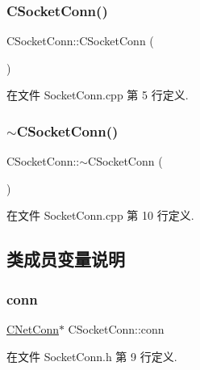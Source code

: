 \subsubsection{\texorpdfstring{C\+Socket\+Conn()}{CSocketConn()}}
{\footnotesize\ttfamily C\+Socket\+Conn\+::\+C\+Socket\+Conn (\begin{DoxyParamCaption}{ }\end{DoxyParamCaption})}



在文件 Socket\+Conn.\+cpp 第 5 行定义.

\mbox{\label{class_c_socket_conn_a4ece15744485f06506faaabd3bc6f6a6}} 
\subsubsection{\texorpdfstring{$\sim$\+C\+Socket\+Conn()}{~CSocketConn()}}
{\footnotesize\ttfamily C\+Socket\+Conn\+::$\sim$\+C\+Socket\+Conn (\begin{DoxyParamCaption}{ }\end{DoxyParamCaption})}



在文件 Socket\+Conn.\+cpp 第 10 行定义.



\subsection{类成员变量说明}
\mbox{\label{class_c_socket_conn_a07e98f72e33f3bf788545c1446c5aaeb}} 
\subsubsection{\texorpdfstring{conn}{conn}}
{\footnotesize\ttfamily \hyperlink{class_c_net_conn}{C\+Net\+Conn}$\ast$ C\+Socket\+Conn\+::conn}



在文件 Socket\+Conn.\+h 第 9 行定义.

\mbox{\label{class_c_socket_conn_a3071170de60991704e2f9a958bfa0b13}} 
